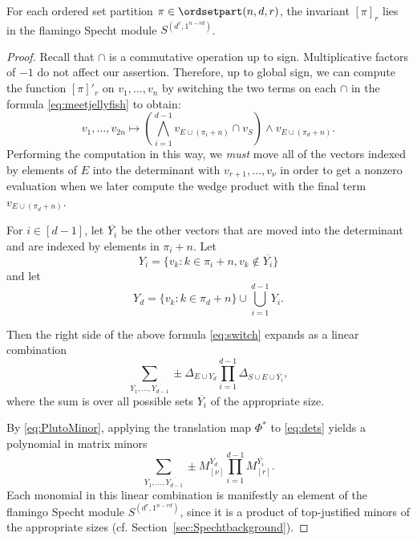 \begin{theorem}\label{thm:inspecht}
For each ordered set partition $\pi \in \ordsetpart(n,d,r)$, the invariant $[\pi]_r$ lies in the flamingo Specht module $S^{(d^r, 1^{n-rd})}$.
\end{theorem}
\begin{proof}
Recall that $\cap$ is a commutative operation up to sign. Multiplicative factors of $-1$ do not affect our assertion. Therefore, up to global sign, we can compute the function $[\pi]'_r$ on $v_1,\dots,v_n$ by switching the two terms on each $\cap$ in the formula \eqref{eq:meetjellyfish} to obtain: 
\begin{equation}\label{eq:switch}
v_1,\dots,v_{2n} \mapsto \left(\bigwedge_{i=1}^{d-1} v_{E \cup (\pi_i+n)} \cap v_{S}\right) \wedge v_{ E\cup (\pi_d+n)}.
\end{equation}
Performing the computation in this way, we \emph{must} move all of the vectors indexed by elements of $E$ into the determinant with $v_{r+1},\ldots,v_{\nu}$ in order to get a nonzero evaluation when we later compute the wedge product with the final term $v_{E \cup (\pi_d+n)}$. 

For $i \in [d-1]$, let $\overline{Y_i}$  be the other vectors that are moved into the determinant and are indexed by elements in $\pi_i+n$. 
Let \[
Y_i = \{ v_k : k \in \pi_i+n, v_k \notin \overline{Y_i}\}
\]
and let 
\[Y_d = \{v_k : k \in \pi_d + n \} \cup \bigcup_{i=1}^{d-1}  Y_i.
\]

Then the right side of the above formula \eqref{eq:switch} expands as a linear combination 
\begin{equation}\label{eq:dets}
\sum_{\overline{Y_1},\dots,\overline{Y_{d-1}}}\pm \Delta_{E \cup Y_d}\prod_{i=1}^{d-1}\Delta_{  S \cup E\cup \overline{Y_i}},
\end{equation}
where the sum is over all possible sets $\overline{Y_i}$ of the appropriate size.

By \eqref{eq:PlutoMinor}, applying the translation map $\Phi^*$ to \eqref{eq:dets} yields a polynomial in matrix minors
\begin{equation}
\sum_{\overline{Y_1},\dots,\overline{Y_{d-1}}}\pm M^{Y_d}_{[\nu]}\prod_{i=1}^{d-1}M^{\overline{Y_i}}_{[r]}.
\end{equation}
Each monomial in this linear combination is manifestly an element of the flamingo Specht module $S^{(d^r, 1^{n-rd})}$, since it is a product of top-justified minors of the appropriate sizes (cf. Section~\ref{sec:Spechtbackground}). 
\end{proof}

